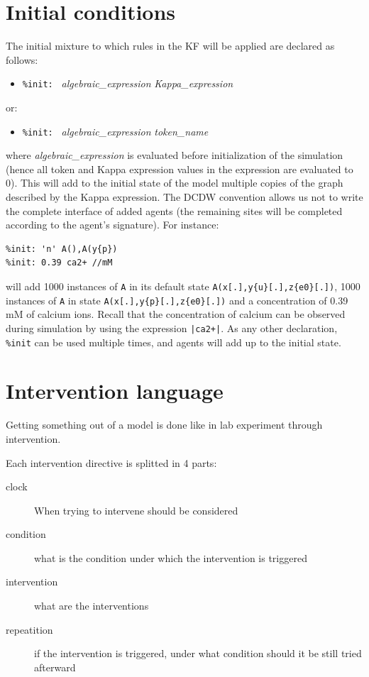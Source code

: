 \documentclass[11pt]{book}
\def\ttt#1{\texttt{#1}}
\def\ITE#1{\begin{itemize}#1\end{itemize}}
\begin{document}
\section{Initial conditions}\label{sec:init}

The initial mixture to which rules in the
KF will be applied are declared as follows: \ITE{
\item[] \ttt{\%init: } \textit{algebraic\_expression} \textit{Kappa\_expression}
}
or:
\ITE{
\item[] \ttt{\%init: }  \textit{algebraic\_expression} \textit{token\_name}
}

where \textit{algebraic\_expression} is evaluated before
initialization of the simulation (hence all token and Kappa expression
values in the expression are evaluated to 0). This will add to the
initial state of the model multiple copies of the graph described by
the Kappa expression. The DCDW convention
 allows us not to write the complete interface of added agents
(the remaining sites will be completed according to the agent's
signature). For instance:
\begin{lstlisting}[language=kappa]
%var: 'n' 1000
%init: 'n' A(),A(y{p})
%init: 0.39 ca2+ //mM
\end{lstlisting}
will add 1000 instances of \ttt{A} in its default state
\ttt{A(x[.],y\{u\}[.],z\{e0\}[.])}, 1000 instances of \ttt{A} in
state \ttt{A(x[.],y\{p\}[.],z\{e0\}[.])} and a concentration of 0.39
mM of calcium ions. Recall that the concentration of calcium can be
observed during simulation by using the expression \ttt{|ca2+|}.  As
any other declaration, \ttt{\%init} can be used
multiple times, and agents will add up to the initial state.

\section{Intervention language}\label{sec:mod}
Getting something out of a model is done like in lab experiment
through intervention.

Each intervention directive is splitted in 4 parts:
\begin{description}
\item[clock] When trying to intervene should be considered
\item[condition] what is the condition under which the intervention is triggered
\item[intervention] what are the interventions
\item[repeatition] if the intervention is triggered, under what
  condition should it be still tried afterward
\end{description}
\end{document}
